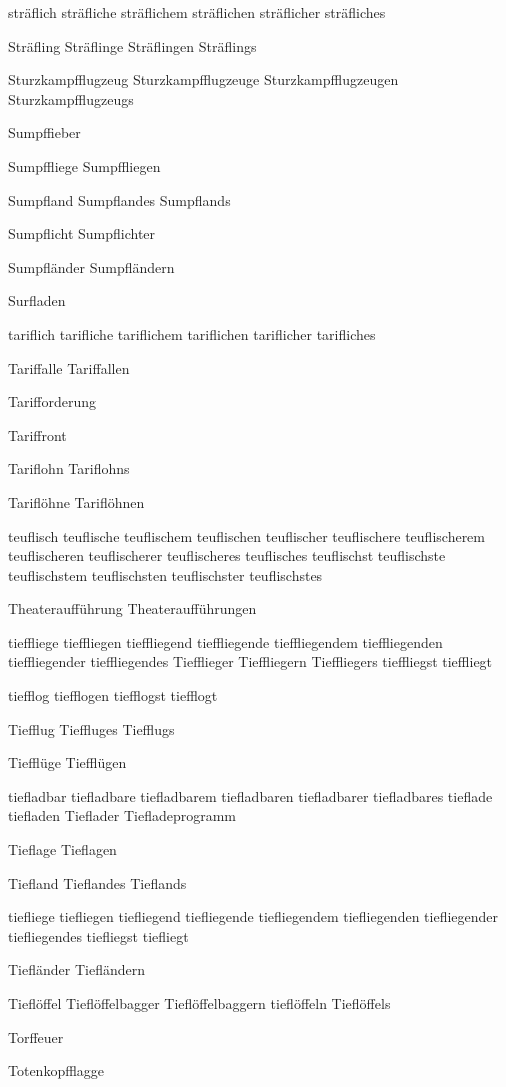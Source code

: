 sträflich sträfliche sträflichem sträflichen sträflicher sträfliches

Sträfling Sträflinge Sträflingen Sträflings

Sturzkampfflugzeug Sturzkampfflugzeuge Sturzkampfflugzeugen Sturzkampfflugzeugs

Sumpffieber

Sumpffliege Sumpffliegen

Sumpfland Sumpflandes Sumpflands

Sumpflicht Sumpflichter

Sumpfländer Sumpfländern

Surfladen

tariflich tarifliche tariflichem tariflichen tariflicher tarifliches

Tariffalle Tariffallen

Tarifforderung

Tariffront

Tariflohn Tariflohns

Tariflöhne Tariflöhnen

teuflisch teuflische teuflischem teuflischen teuflischer teuflischere teuflischerem teuflischeren teuflischerer teuflischeres teuflisches teuflischst teuflischste teuflischstem teuflischsten teuflischster teuflischstes

Theateraufführung Theateraufführungen

tieffliege tieffliegen tieffliegend tieffliegende tieffliegendem tieffliegenden tieffliegender tieffliegendes Tiefflieger Tieffliegern Tieffliegers tieffliegst tieffliegt

tiefflog tiefflogen tiefflogst tiefflogt

Tiefflug Tieffluges Tiefflugs

Tiefflüge Tiefflügen

tiefladbar tiefladbare tiefladbarem tiefladbaren tiefladbarer tiefladbares tieflade tiefladen Tieflader Tiefladeprogramm

Tieflage Tieflagen

Tiefland Tieflandes Tieflands

tiefliege tiefliegen tiefliegend tiefliegende tiefliegendem tiefliegenden tiefliegender tiefliegendes tiefliegst tiefliegt

Tiefländer Tiefländern

Tieflöffel Tieflöffelbagger Tieflöffelbaggern tieflöffeln Tieflöffels

Torffeuer

Totenkopfflagge

